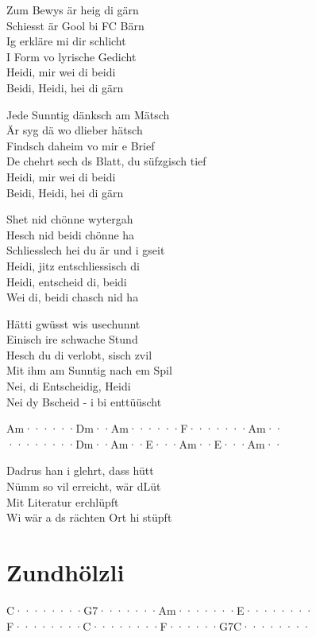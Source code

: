 \documentclass[
  letterpaper,
  a5paper]{memoir}
\begin{document}
Zum Bewys är heig di gärn\\
Schiesst är Gool bi FC Bärn\\
Ig erkläre mi dir schlicht\\
I Form vo lyrische Gedicht\\
Heidi, mir wei di beidi\\
Beidi, Heidi, hei di gärn

Jede Sunntig dänksch am Mätsch\\
Är syg dä wo d\textquotesingle lieber hätsch\\
Findsch daheim vo mir e Brief\\
De chehrt sech ds Blatt, du süfzgisch tief\\
Heidi, mir wei di beidi\\
Beidi, Heidi, hei di gärn

S\textquotesingle het nid chönne wytergah\\
Hesch nid beidi chönne ha\\
Schliesslech hei du är und i gseit\\
Heidi, jitz entschliessisch di\\
Heidi, entscheid di, beidi\\
Wei di, beidi chasch nid ha

Hätti gwüsst wis usechunnt\\
Einisch ire schwache Stund\\
Hesch du di verlobt, s\textquotesingle isch zvil\\
Mit ihm am Sunntig nach em Spil\\
Nei, di Entscheidig, Heidi\\
Nei dy Bscheid - i bi enttüüscht

\textbar Am······\textbar Dm··Am··\textbar····F···\textbar····Am··\textbar{}\\
\textbar········\textbar Dm··Am··\textbar E···Am··\textbar E···Am··\textbar{}

Dadrus han i glehrt, dass hütt\\
Nümm so vil erreicht, wär d\textquotesingle Lüt\\
Mit Literatur erchlüpft\\
Wi wär a ds rächten Ort hi stüpft

\hypertarget{zundhuxf6lzli}{%
\chapter{Zundhölzli}\label{zundhuxf6lzli}}

\textbar C········\textbar G7·······\textbar Am·······\textbar E········\textbar{}\\
\textbar F········\textbar C········\textbar F······G7\textbar C········\textbar{}
\end{document}
